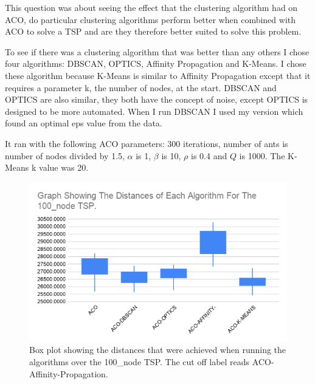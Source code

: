 This question was about seeing the effect that the clustering algorithm had on ACO, do particular clustering algorithms perform better when combined with ACO to solve a TSP and are they therefore better suited to solve this problem.

To see if there was a clustering algorithm that was better than any others I chose four algorithms: DBSCAN, OPTICS, Affinity Propagation and K-Means. I chose these algorithm because K-Means is similar to Affinity Propagation except that it requires a parameter k, the number of nodes, at the start. DBSCAN and OPTICS are also similar, they both have the concept of noise, except OPTICS is designed to be more automated. When I run DBSCAN I used my version which found an optimal eps value from the data. 

It ran with the following ACO parameters: 300 iterations, number of ants is number of nodes divided by 1.5, $\alpha$ is 1, $\beta$ is 10, $\rho$ is 0.4 and $Q$ is 1000. The K-Means k value was 20.

\begin{figure}
    \centering
    \includegraphics[width=\textwidth]{figures/distance_100_node_graph.png}
    \caption{Box plot showing the distances that were achieved when running the algorithms over the 100\_node TSP. The cut off label reads ACO-Affinity-Propagation.}
    \label{fig:distance_100_node}
\end{figure}

